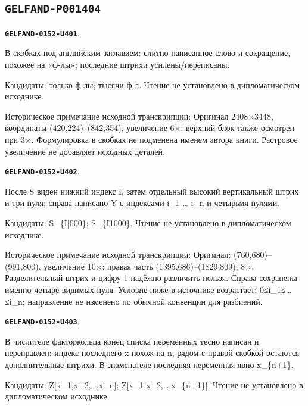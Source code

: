 \documentclass[11pt]{article}
\theoremstyle{definition}
\theoremstyle{remark}
\begin{document}
\subsection*{\texttt{GELFAND-P001404}}
\par\noindent\leavevmode{}\label{GELFAND-0152-U401}\label{GELFAND-P001404:book-parenthesis:note}\textbf{\texttt{GELFAND-0152-U401}}.\nopagebreak[4]\par
В скобках под английским заглавием: слитно написанное слово и сокращение, похожее на «ф-лы»; последние штрихи усилены/переписаны.\par
Кандидаты: только ф-лы; тысячи ф-л. Чтение не установлено в дипломатическом исходнике.\par
Историческое примечание исходной транскрипции: Оригинал 2408×3448, координаты (420,224)–(842,354), увеличение 6×; верхний блок также осмотрен при 3×. Формулировка в скобках не подменена именем автора книги. Растровое увеличение не добавляет исходных деталей.\par\medskip
\par\noindent\leavevmode{}\label{GELFAND-0152-U402}\label{GELFAND-P001404:theorem25-left-index:note}\textbf{\texttt{GELFAND-0152-U402}}.\nopagebreak[4]\par
После S виден нижний индекс I, затем отдельный высокий вертикальный штрих и три нуля; справа написано Y с индексами i\_1 … i\_n и четырьмя нулями.\par
Кандидаты: S\_\{I|000\}; S\_\{I1000\}. Чтение не установлено в дипломатическом исходнике.\par
Историческое примечание исходной транскрипции: Оригинал: (760,680)–(991,800), увеличение 10×; правая часть (1395,686)–(1829,809), 8×. Разделительный штрих и цифру 1 надёжно различить нельзя. Справа сохранены именно четыре видимых нуля. Условие ниже в источнике возрастает: 0≤i\_1≤…≤i\_n; направление не изменено по обычной конвенции для разбиений.\par\medskip
\par\noindent\leavevmode{}\label{GELFAND-0152-U403}\label{GELFAND-P001404:finite26-left:note}\textbf{\texttt{GELFAND-0152-U403}}.\nopagebreak[4]\par
В числителе факторкольца конец списка переменных тесно написан и переправлен: индекс последнего x похож на n, рядом с правой скобкой остаются дополнительные штрихи. В знаменателе последняя переменная явно x\_\{n+1\}.\par
Кандидаты: Z[x\_1,x\_2,…,x\_n]; Z[x\_1,x\_2,…,x\_\{n+1\}]. Чтение не установлено в дипломатическом исходнике.\par
\end{document}
